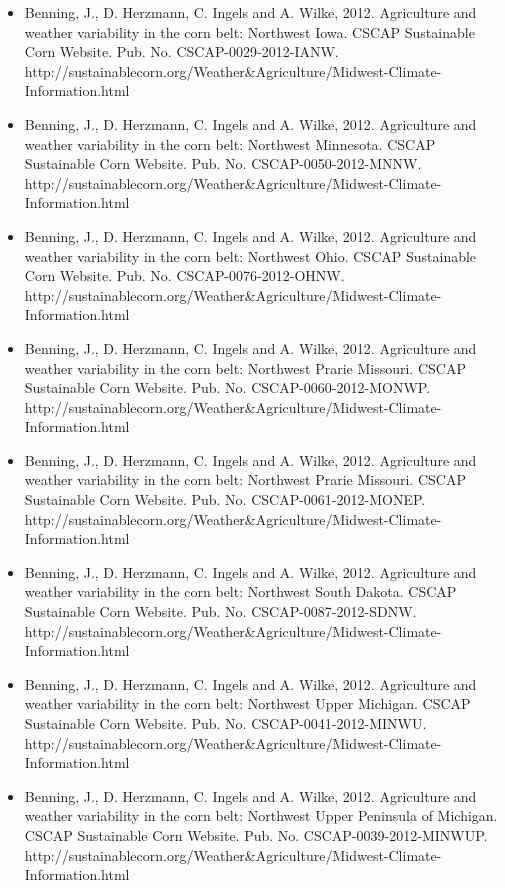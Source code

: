 \begin{itemize}
\item Benning, J., D. Herzmann, C. Ingels and A. Wilke, 2012. Agriculture and weather variability in the corn belt: Northwest Iowa. CSCAP Sustainable Corn Website. Pub. No. CSCAP-0029-2012-IANW. http://sustainablecorn.org/Weather\&Agriculture/Midwest-Climate-Information.html
\item Benning, J., D. Herzmann, C. Ingels and A. Wilke, 2012. Agriculture and weather variability in the corn belt: Northwest Minnesota. CSCAP Sustainable Corn Website. Pub. No. CSCAP-0050-2012-MNNW. http://sustainablecorn.org/Weather\&Agriculture/Midwest-Climate-Information.html
\item Benning, J., D. Herzmann, C. Ingels and A. Wilke, 2012. Agriculture and weather variability in the corn belt: Northwest Ohio. CSCAP Sustainable Corn Website. Pub. No. CSCAP-0076-2012-OHNW. http://sustainablecorn.org/Weather\&Agriculture/Midwest-Climate-Information.html
\item Benning, J., D. Herzmann, C. Ingels and A. Wilke, 2012. Agriculture and weather variability in the corn belt: Northwest Prarie Missouri. CSCAP Sustainable Corn Website. Pub. No. CSCAP-0060-2012-MONWP. http://sustainablecorn.org/Weather\&Agriculture/Midwest-Climate-Information.html
\item Benning, J., D. Herzmann, C. Ingels and A. Wilke, 2012. Agriculture and weather variability in the corn belt: Northwest Prarie Missouri. CSCAP Sustainable Corn Website. Pub. No. CSCAP-0061-2012-MONEP. http://sustainablecorn.org/Weather\&Agriculture/Midwest-Climate-Information.html
\item Benning, J., D. Herzmann, C. Ingels and A. Wilke, 2012. Agriculture and weather variability in the corn belt: Northwest South Dakota. CSCAP Sustainable Corn Website. Pub. No. CSCAP-0087-2012-SDNW. http://sustainablecorn.org/Weather\&Agriculture/Midwest-Climate-Information.html
\item Benning, J., D. Herzmann, C. Ingels and A. Wilke, 2012. Agriculture and weather variability in the corn belt: Northwest Upper Michigan. CSCAP Sustainable Corn Website. Pub. No. CSCAP-0041-2012-MINWU. http://sustainablecorn.org/Weather\&Agriculture/Midwest-Climate-Information.html
\item Benning, J., D. Herzmann, C. Ingels and A. Wilke, 2012. Agriculture and weather variability in the corn belt: Northwest Upper Peninsula of Michigan. CSCAP Sustainable Corn Website. Pub. No. CSCAP-0039-2012-MINWUP. http://sustainablecorn.org/Weather\&Agriculture/Midwest-Climate-Information.html

\end{itemize}
